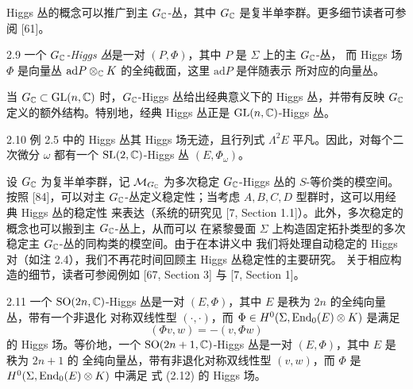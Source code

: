 Higgs 丛的概念可以推广到主 $G_{\mathbb{C}}$-丛，其中 $G_{\mathbb{C}}$ 是复半单李群。更多细节读者可参阅 [61]。

\begin{defn}{2.9}
一个 \emph{$G_{\mathbb{C}}$-Higgs 丛}是一对 $(P,\Phi)$，其中 $P$ 是 $\Sigma$ 上的主 $G_{\mathbb{C}}$-丛，
而 Higgs 场 $\Phi$ 是向量丛 $\mathrm{ad}P\otimes_{\mathbb{C}} K$ 的全纯截面，这里 $\mathrm{ad}P$ 是伴随表示
所对应的向量丛。
\end{defn}

当 $G_{\mathbb{C}}\subset\mathrm{GL}(n,\mathbb{C})$ 时，$G_{\mathbb{C}}$-Higgs 丛给出经典意义下的 Higgs 丛，并带有反映 $G_{\mathbb{C}}$
定义的额外结构。特别地，经典 Higgs 丛正是 $\mathrm{GL}(n,\mathbb{C})$-Higgs 丛。

\begin{exmp}{2.10}
例 2.5 中的 Higgs 丛其 Higgs 场无迹，且行列式 $\Lambda^2E$ 平凡。因此，对每个二次微分 $\omega$
都有一个 $\mathrm{SL}(2,\mathbb{C})$-Higgs 丛 $(E,\Phi_\omega)$。
\end{exmp}

设 $G_{\mathbb{C}}$ 为复半单李群，记 $\mathcal{M}_{G_{\mathbb{C}}}$ 为多次稳定 $G_{\mathbb{C}}$-Higgs 丛的 $S$-等价类的模空间。
按照 [84]，可以对主 $G_{\mathbb{C}}$-丛定义稳定性；当考虑 $A,B,C,D$ 型群时，这可以用经典 Higgs 丛的稳定性
来表达（系统的研究见 [7, Section 1.1]）。此外，多次稳定的概念也可以搬到主 $G_{\mathbb{C}}$-丛上，从而可以
在紧黎曼面 $\Sigma$ 上构造固定拓扑类型的多次稳定主 $G_{\mathbb{C}}$-丛的同构类的模空间。由于在本讲义中
我们将处理自动稳定的 Higgs 对（如注 2.4），我们不再花时间回顾主 Higgs 丛稳定性的主要研究。
关于相应构造的细节，读者可参阅例如 [67, Section 3] 与 [7, Section 1]。

\begin{exmp}{2.11}
一个 $\mathrm{SO}(2n,\mathbb{C})$-Higgs 丛是一对 $(E,\Phi)$，其中 $E$ 是秩为 $2n$ 的全纯向量丛，带有一个非退化
对称双线性型 $(\cdot,\cdot)$，而 $\Phi\in H^0(\Sigma,\operatorname{End}_0(E)\otimes K)$ 是满足
\begin{equation}
  (\Phi v,w) = -(v,\Phi w) \tag{2.12}
\end{equation}
的 Higgs 场。等价地，一个 $\mathrm{SO}(2n+1,\mathbb{C})$-Higgs 丛是一对 $(E,\Phi)$，其中 $E$ 是秩为 $2n+1$ 的
全纯向量丛，带有非退化对称双线性型 $(v,w)$，而 $\Phi$ 是 $H^0(\Sigma,\operatorname{End}_0(E)\otimes K)$ 中满足
式 (2.12) 的 Higgs 场。
\end{exmp}
